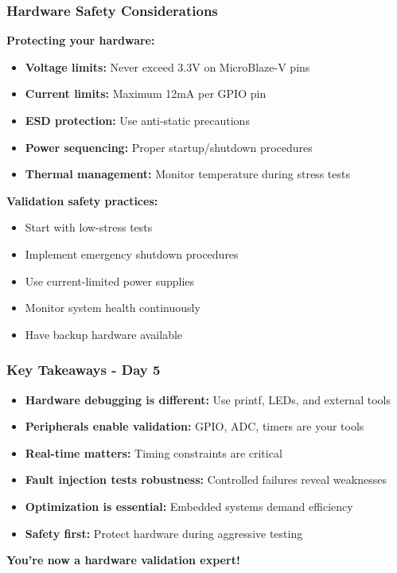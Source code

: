 \documentclass{beamer}
\begin{document}
\begin{frame}
\frametitle{Hardware Safety Considerations}
\textbf{Protecting your hardware:}
\begin{itemize}
    \item \footnotesize \textbf{Voltage limits:} Never exceed 3.3V on MicroBlaze-V pins
    \item \footnotesize \textbf{Current limits:} Maximum 12mA per GPIO pin
    \item \footnotesize \textbf{ESD protection:} Use anti-static precautions
    \item \footnotesize \textbf{Power sequencing:} Proper startup/shutdown procedures
    \item \footnotesize \textbf{Thermal management:} Monitor temperature during stress tests
\end{itemize}

\vspace{0.2cm}
\textbf{Validation safety practices:}
\begin{itemize}
    \item \footnotesize Start with low-stress tests
    \item \footnotesize Implement emergency shutdown procedures
    \item \footnotesize Use current-limited power supplies
    \item \footnotesize Monitor system health continuously
    \item \footnotesize Have backup hardware available
\end{itemize}
\end{frame}

\begin{frame}
\frametitle{Key Takeaways - Day 5}
\begin{itemize}
    \item \footnotesize \textbf{Hardware debugging is different:} Use printf, LEDs, and external tools
    \item \footnotesize \textbf{Peripherals enable validation:} GPIO, ADC, timers are your tools
    \item \footnotesize \textbf{Real-time matters:} Timing constraints are critical
    \item \footnotesize \textbf{Fault injection tests robustness:} Controlled failures reveal weaknesses
    \item \footnotesize \textbf{Optimization is essential:} Embedded systems demand efficiency
    \item \footnotesize \textbf{Safety first:} Protect hardware during aggressive testing
\end{itemize}

\vspace{0.5cm}
\begin{center}
\textbf{You're now a hardware validation expert!}
\end{center}
\end{frame}
\end{document}
